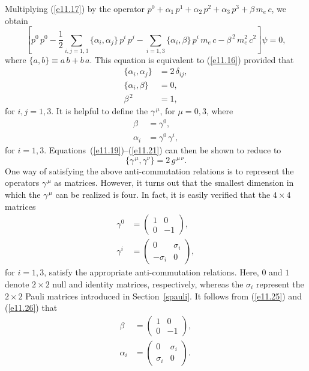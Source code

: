 Multiplying (\ref{e11.17}) by the operator $p^0 +\alpha_1\,p^1+\alpha_2\,p^2+\alpha_3\,p^3+\beta\,m_e\,c$, we obtain
\begin{equation}
\left[p^0\,p^0-\frac{1}{2}\sum_{i,j=1,3}\{\alpha_i,\alpha_j\}\,p^i\,p^j-\sum_{i=1,3}\{\alpha_i,\beta\}\,p^i\,m_e\,c-\beta^{\,2}\,m_e^2\,c^2\right]\psi= 0,
\end{equation}
where $\{a,b\}\equiv a\,b+b\,a$. 
This equation is equivalent to (\ref{e11.16}) provided that
\begin{align}\label{e11.19}
\{\alpha_i,\alpha_j\}&=2\,\delta_{ij},\\[0.5ex]
\{\alpha_i,\beta\}&= 0,\label{e11.20}\\[0.5ex]
\beta^{\,2} &= 1,\label{e11.21}
\end{align}
for $i,j=1,3$. 
It is helpful to define the $\gamma^{\,\mu}$, for $\mu=0,3$, where
\begin{align}\label{e11.25}
\beta &=\gamma^0,\\[0.5ex]
\alpha_i &= \gamma^0\,\gamma^i,\label{e11.26}
\end{align}
for $i=1,3$. 
Equations~(\ref{e11.19})--(\ref{e11.21}) can then be shown to reduce to
\begin{equation}\label{e11.26a}
\{\gamma^{\,\mu},\gamma^\nu\} = 2\,g^{\,\mu\,\nu}.
\end{equation}
One way of satisfying the above anti-commutation relations is to represent the operators $\gamma^{\,\mu}$ as matrices. However, it turns
out that the smallest  dimension in which the $\gamma^{\,\mu}$ can be realized   is four. In fact, it is easily verified that the  $4\times 4$ matrices 
\begin{align}\label{e11.26t}
\gamma^0 &= \left(\begin{array}{rr} 1& 0\\[0.5ex]0&-1\end{array}\right),\\[0.5ex]
\gamma^i &= \left(\begin{array}{rr} 0& \sigma_i\\[0.5ex]-\sigma_i&0\end{array}\right),\label{e11.27t}
\end{align}
for $i=1,3$, satisfy the appropriate anti-commutation relations. Here, $0$ and $1$ denote $2\times 2$ null and identity matrices, respectively, whereas the $\sigma_i$ represent the $2\times 2$ Pauli matrices
introduced in Section~\ref{spauli}. 
It follows from (\ref{e11.25}) and (\ref{e11.26}) that
\begin{align}\label{e11.28g}
\beta &= \left(\begin{array}{rr} 1& 0\\[0.5ex]0&-1\end{array}\right),\\[0.5ex]
\alpha_i &= \left(\begin{array}{rr} 0& \sigma_i\\[0.5ex]\sigma_i&0\end{array}\right).\label{e11.29g}
\end{align}
